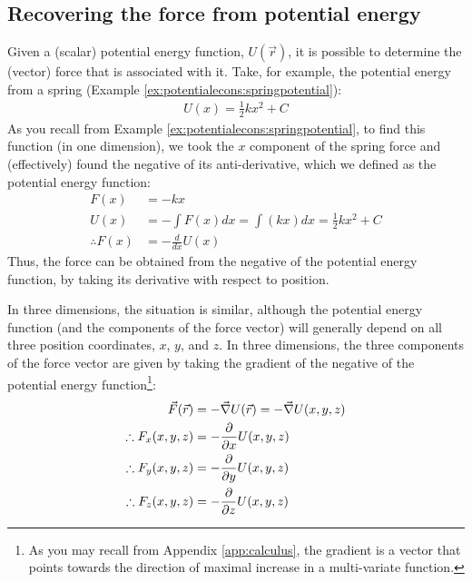 \subsection{Recovering the force from potential energy}
\label{sec:potentialecons:forcefromu}
Given a (scalar) potential energy function, $U(\vec r)$, it is possible to determine the (vector) force that is associated with it. Take, for example, the potential energy from a spring (Example \ref{ex:potentialecons:springpotential}):
\begin{align*}
U(x) = \frac{1}{2}kx^2 + C
\end{align*} 
As you recall from Example \ref{ex:potentialecons:springpotential}, to find this function (in one dimension), we took the $x$ component of the spring force and (effectively) found the negative of its anti-derivative, which we defined as the potential energy function:
\begin{align*}
F(x) &= -kx\\
U(x) &= -\int F(x) dx = \int (kx) dx = \frac{1}{2}kx^2+C\\
\therefore F(x) &= -\frac{d}{dx}U(x)
\end{align*}
Thus, the force can be obtained from the negative of the potential energy function, by taking its derivative with respect to position.

In three dimensions, the situation is similar, although the potential energy function (and the components of the force vector) will generally depend on all three position coordinates, $x$, $y$, and $z$. In three dimensions, the three components of the force vector are given by taking the gradient of the negative of the potential energy function\footnote{As you may recall from Appendix \ref{app:calculus}, the gradient is a vector that points towards the direction of maximal increase in a multi-variate function.}:
\begin{align}
\vec F(\vec r) &= -\vec\nabla U(\vec r)=-\vec\nabla U(x,y,z)\nonumber\\
\therefore F_x(x,y,z) &= -\frac{\partial }{\partial x}U(x,y,z)\nonumber\\
\therefore F_y(x,y,z) &= -\frac{\partial }{\partial y}U(x,y,z)\nonumber\\
\therefore F_z(x,y,z) &= -\frac{\partial }{\partial z}U(x,y,z)
\end{align}

